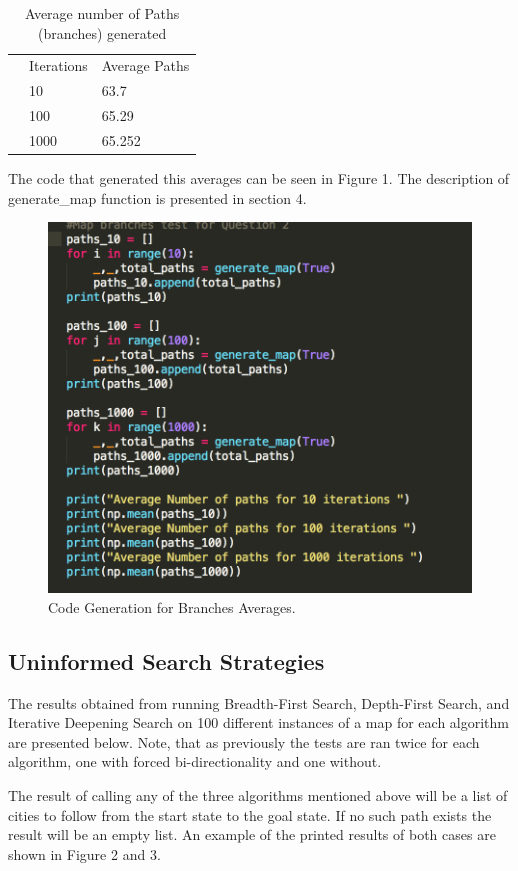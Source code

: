 \documentclass[12pt, letter]{article}
\begin{document}
\begin{table}[htb]
\centering
\caption{Average number of Paths (branches) generated}
\label{my-label}
\begin{tabular}{lll}
 & Iterations & Average Paths \\
 & 10         & 63.7          \\
 & 100        & 65.29         \\
 & 1000       & 65.252       
\end{tabular}
\end{table}

\FloatBarrier

The code that generated this averages can be seen in Figure 1. The description of generate\_map function is presented in section 4.

\begin{figure}[htb]
  \centering
  \includegraphics[width=0.6 \textwidth]{./graphs/branches.png}
  \caption{Code Generation for Branches Averages.}
\end{figure}

\FloatBarrier

\subsection{Uninformed Search Strategies}

The results obtained from running Breadth-First Search, Depth-First Search, and Iterative Deepening Search on 100 different instances of a map for each algorithm are presented below. Note, that as previously the tests are ran twice for each algorithm, one with forced bi-directionality and one without. 

The result of calling any of the three algorithms mentioned above will be a list of cities to follow from the start state to the goal state. If no such path exists the result will be an empty list. An example of the printed results of both cases are shown in Figure 2 and 3. 
\end{document}

